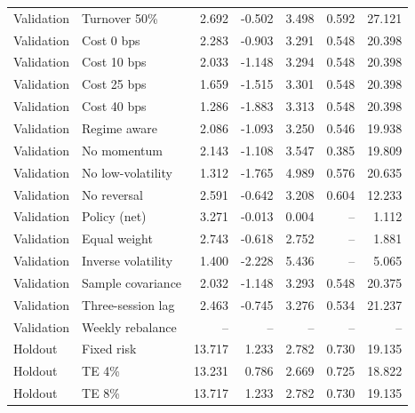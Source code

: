 \documentclass[11pt,a4paper]{article}
\begin{document}
\begin{center}
\begin{longtable}{@{}llrrrrr@{}}
Validation & Turnover 50\% & 2.692 & -0.502 & 3.498 & 0.592 & 27.121\\

Validation & Cost 0 bps & 2.283 & -0.903 & 3.291 & 0.548 & 20.398\\

Validation & Cost 10 bps & 2.033 & -1.148 & 3.294 & 0.548 & 20.398\\

Validation & Cost 25 bps & 1.659 & -1.515 & 3.301 & 0.548 & 20.398\\

Validation & Cost 40 bps & 1.286 & -1.883 & 3.313 & 0.548 & 20.398\\

Validation & Regime aware & 2.086 & -1.093 & 3.250 & 0.546 & 19.938\\

Validation & No momentum & 2.143 & -1.108 & 3.547 & 0.385 & 19.809\\

Validation & No low-volatility & 1.312 & -1.765 & 4.989 & 0.576 & 20.635\\

Validation & No reversal & 2.591 & -0.642 & 3.208 & 0.604 & 12.233\\

Validation & Policy (net) & 3.271 & -0.013 & 0.004 & -- & 1.112\\

Validation & Equal weight & 2.743 & -0.618 & 2.752 & -- & 1.881\\

Validation & Inverse volatility & 1.400 & -2.228 & 5.436 & -- & 5.065\\

Validation & Sample covariance & 2.032 & -1.148 & 3.293 & 0.548 & 20.375\\

Validation & Three-session lag & 2.463 & -0.745 & 3.276 & 0.534 & 21.237\\

Validation & Weekly rebalance & -- & -- & -- & -- & --\\

\pagebreak

Holdout & Fixed risk & 13.717 & 1.233 & 2.782 & 0.730 & 19.135\\

Holdout & TE 4\% & 13.231 & 0.786 & 2.669 & 0.725 & 18.822\\

Holdout & TE 8\% & 13.717 & 1.233 & 2.782 & 0.730 & 19.135\\


\end{longtable}
\end{center}
\end{document}
